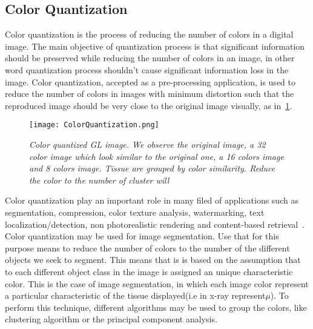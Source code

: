 \documentclass{standalone}
\begin{document}
	\subsection{Color Quantization}
	

	Color quantization is the process of reducing the number of colors in a digital image. The main objective of quantization process is that 
	significant information should be preserved while reducing the number of colors in an image, in other word quantization process shouldn’t cause 
	significant information loss in the image. 
	Color quantization, accepted as a pre-processing application, is used to reduce the number of colors in images with minimum distortion such that the 
	reproduced image should be very close to the original image visually, as in \figurename\,\ref{fig:ColorQuantization}. 

	\begin{figure}[h!]
		
		\centering
			\texttt{[image: ColorQuantization.png]}
		\caption{\textit{Color quantized GL image. We observe the original image, a 32 color image which look similar to the original one, a 16 colors image and 8 colors image. Tissue are grouped by color similarity. Reduce the color to the number of cluster will }}\label{fig:ColorQuantization}
	\end{figure}

	Color quantization play an important role in many filed of applications such as segmentation, compression, color texture analysis, watermarking, 
	text localization/detection, non photorealistic rendering and content-based retrieval~\cite{ART:Ozturk}.\\
	
	
	Color quantization may be used for image segmentation. Use that for this purpose means to reduce the number of colors to the number of the different objects we seek to segment. This means that is is based on the assumption that to each different object class in the image is assigned an unique characteristic color. This is the case of image segmentation, in which each image color represent a particular characteristic of the tissue displayed(i.e in x-ray represent$\mu$). 
	To perform this technique, different algorithms may be used to group the colors, like clustering algorithm or the principal component analysis.


	
	
	
	

	
	
\end{document}

